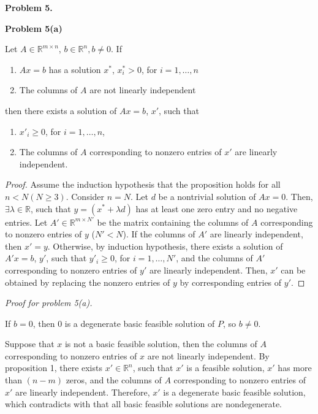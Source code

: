 \documentclass[12pt]{article}
\newenvironment{proposition}[2][Proposition]{\begin{trivlist}
\item[\hskip \labelsep {\bfseries #1}\hskip \labelsep {\bfseries #2.}]}{\end{trivlist}}
\begin{document}
\vspace{\baselineskip}
\noindent
\textbf{Problem 5.}

\noindent
\textbf{Problem 5(a)} 
\begin{proposition}{1}
Let $A \in \mathbb{R}^{m\times n}$, $b\in \mathbb{R}^n, b \ne 0$. If 
\begin{enumerate}
    \item $Ax=b$ has a solution $x^*$, $x^*_{i} > 0$, for $i=1, \hdots, n$
    \item The columns of $A$ are not linearly independent
\end{enumerate}
then there exists a solution of $Ax=b$, $x'$, such that
\begin{enumerate}
    \item $x'_i \ge 0$, for $i=1, \hdots, n$, 
    \item The columns of $A$ corresponding to nonzero entries of $x'$ are linearly independent.
\end{enumerate} 
\end{proposition}

\begin{proof}
Assume the induction hypothesis that the proposition holds for all $n < N (N \ge 3)$. Consider $n=N$. Let $d$ be a nontrivial solution of $Ax=0$. Then, $\exists \lambda \in \mathbb{R}$, such that
$
    y = (x^* + \lambda d )
$
has at least one zero entry and no negative entries. Let $A' \in \mathbb{R}^{m\times N'}$ be the matrix containing the columns of $A$ corresponding to nonzero entries of $y$ ($N'<N$). If the columns of $A'$ are linearly independent, then $x'=y$. Otherwise, by induction hypothesis, there exists a solution of $A'x=b$, $y'$, such that $y'_i \ge 0$, for $i=1, \hdots, N'$, and the columns of $A'$ corresponding to nonzero entries of $y'$ are linearly independent. Then, $x'$ can be obtained by replacing the nonzero entries of $y$ by corresponding entries of $y'$.
\end{proof}

\noindent
{\em Proof for problem 5(a).}

If $b=0$, then $0$ is a degenerate basic feasible solution of $P$, so $b\ne 0$.

Suppose that $x$ is not a basic feasible solution, then the columns of $A$ corresponding to nonzero entries of $x$ are not linearly independent. By proposition 1, there exists $x' \in \mathbb{R}^{n}$, such that 
$
x'$ is a feasible solution, $x'$ has more than $(n-m)$ zeros, and the columns of $A$ corresponding to nonzero entries of $x'$ are linearly independent. Therefore, $x'$ is a degenerate basic feasible solution, which contradicts with that all basic feasible solutions are nondegenerate.
\end{document}
